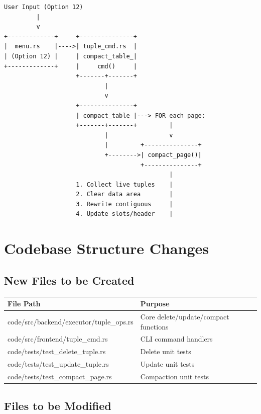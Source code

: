 \documentclass[11pt,a4paper]{article}
\begin{document}
\begin{lstlisting}
User Input (Option 12)
         |
         v
+-------------+     +---------------+
|  menu.rs    |---->| tuple_cmd.rs  |
| (Option 12) |     | compact_table_|
+-------------+     |     cmd()     |
                    +-------+-------+
                            |
                            v
                    +---------------+
                    | compact_table |---> FOR each page:
                    +-------+-------+         |
                            |                 v
                            |         +---------------+
                            +-------->| compact_page()|
                                      +---------------+
                                              |
                    1. Collect live tuples    |
                    2. Clear data area        |
                    3. Rewrite contiguous     |
                    4. Update slots/header    |
\end{lstlisting}

\section{Codebase Structure Changes}

\subsection{New Files to be Created}

\begin{table}[H]
\centering
\begin{tabular}{@{}ll@{}}
\toprule
\textbf{File Path} & \textbf{Purpose} \\
\midrule
code/src/backend/executor/tuple\_ops.rs & Core delete/update/compact functions \\
code/src/frontend/tuple\_cmd.rs & CLI command handlers \\
code/tests/test\_delete\_tuple.rs & Delete unit tests \\
code/tests/test\_update\_tuple.rs & Update unit tests \\
code/tests/test\_compact\_page.rs & Compaction unit tests \\
\bottomrule
\end{tabular}
\end{table}

\subsection{Files to be Modified}
\end{document}
